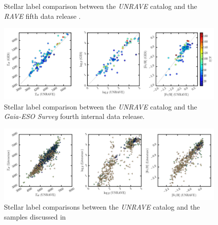 \documentclass[preprint,trackchanges]{aastex}
\newcommand{\project}[1]{\textsl{#1}}
\begin{document}
\begin{figure}[p]
\caption{Stellar label comparison between the \project{UNRAVE} catalog and the \project{RAVE} fifth data release \citep{Kunder_2016}.\label{fig:rave-dr5-comparison}}
\end{figure}

\begin{figure}[p]
\includegraphics[width=\textwidth]{figures/ges-comparison.png}
\caption{Stellar label comparison between the \project{UNRAVE} catalog and the \project{Gaia-ESO Survey} fourth internal data release.\label{fig:ges-dr4-comparison}}
\end{figure}

\begin{figure}[p]
\includegraphics[width=\textwidth]{figures/literature-comparison.png}
\caption{Stellar label comparisons between the \project{UNRAVE} catalog and the samples discussed in \citep{Kordopatis_2013}}
\end{figure}
\end{document}
